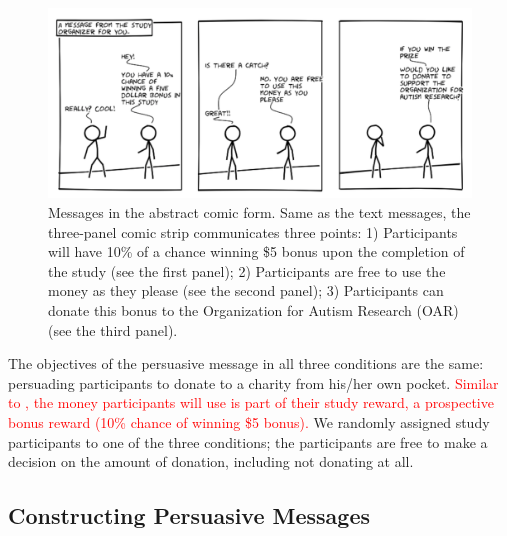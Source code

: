 \begin{figure}[bt]
    \centering
    \includegraphics[width=\columnwidth]{./figures/abstract_comic.png}
    \caption{Messages in the abstract comic form. Same as the text messages, the three-panel comic strip communicates three points: 1) Participants will have 10\% of a chance winning \$5 bonus upon the completion of the study (see the first panel); 2) Participants are free to use the money as they please (see the second panel); 3) Participants can donate this bonus to the Organization for Autism Research (OAR) (see the third panel).}
    \label{fig:basic three comic panel}
\end{figure}

The objectives of the persuasive message in all three conditions are the same: persuading participants to donate to a charity from his/her own pocket. \textcolor{red}{Similar to \textcite{lee2013does,saunders2016no}, the money participants will use is part of their study reward, a prospective bonus reward (10\% chance of winning \$5 bonus).} We randomly assigned study participants to one of the three conditions; the participants are free to make a decision on the amount of donation, including not donating at all.




\subsection{Constructing Persuasive Messages}
\label{sub:Constructing Persuasive Messages}





